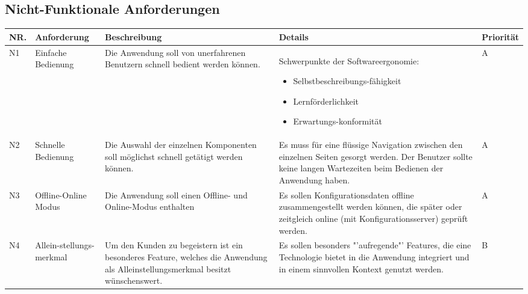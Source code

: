 \subsection{Nicht-Funktionale Anforderungen}\label{non_functional_requirements}
\begin{tabular}[H]{| p{0.5cm} | p{2.2cm} | p{4.5cm} | p{5.3cm} | p{1.3cm} |}
\toprule[2pt] \rowcolor{dunkelgrau}
\hline
  NR. & Anforderung & Beschreibung & Details & Priorität \\
  \hline
  N1 & Einfache \newline Bedienung & Die Anwendung soll von unerfahrenen Benutzern schnell bedient werden können.& Schwerpunkte der Softwareergonomie\cite{bib:softwareErgonomie}: 
  \begin{itemize}
        \item Selbstbeschreibungs-fähigkeit
        \item Lernförderlichkeit
        \item Erwartungs-konformität
     \end{itemize}
   & A \\
  \hline
  N2 & Schnelle Bedienung & Die Auswahl der einzelnen Komponenten soll möglichst schnell getätigt werden können. & Es muss für eine flüssige Navigation zwischen den einzelnen Seiten gesorgt werden. Der Benutzer sollte keine langen Wartezeiten beim Bedienen der Anwendung haben. & A \\
  \hline
    N3 & Offline-Online Modus & Die Anwendung soll einen Offline- und Online-Modus enthalten & Es sollen Konfigurationsdaten offline zusammengestellt werden können, die später oder zeitgleich online (mit Konfigurationsserver) geprüft werden. & A \\
    \hline
    N4 & Allein-stellungs-merkmal & Um den Kunden zu begeistern ist ein besonderes Feature, welches die Anwendung als Alleinstellungsmerkmal besitzt wünschenswert.& Es sollen besonders "'aufregende"' Features, die eine Technologie bietet in die Anwendung integriert und in einem sinnvollen Kontext genutzt werden.  & B\\
    \hline
\bottomrule[2pt]
\end{tabular}

